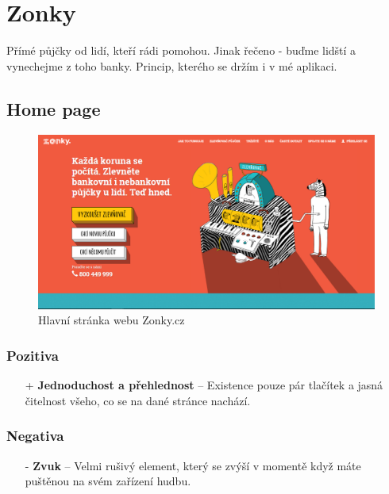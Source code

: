 \section{Zonky \cite{zonky}}
\label{analyza:zonky}

Přímé půjčky od lidí, kteří rádi pomohou. Jinak řečeno - buďme lidští a vynechejme z toho banky. Princip, kterého se držím i v mé aplikaci.

\subsection{Home page}
\begin{figure}[h]
    \centering
    \includegraphics[width=1.0\textwidth]{media/zonky/home.png}
    \caption{Hlavní stránka webu Zonky.cz}
    \label{fig:zonky:home}
\end{figure}
\subsubsection*{Pozitiva}
\begin{itemize}
    \item[+] \textbf{Jednoduchost a přehlednost} -- Existence pouze pár tlačítek a jasná čitelnost všeho, co se na dané stránce nachází.
\end{itemize}
\subsubsection*{Negativa}
\begin{itemize}
    \item[-] \textbf{Zvuk} -- Velmi rušivý element, který se zvýší v momentě když máte puštěnou na svém zařízení hudbu.
\end{itemize}



